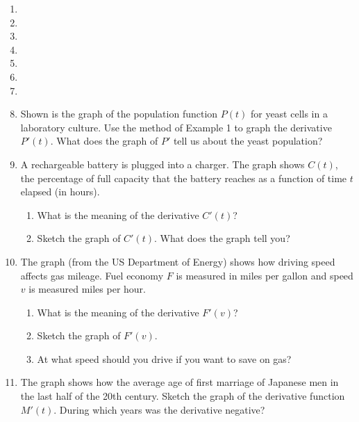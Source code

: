 \documentclass{article}
\begin{document}
\begin{enumerate}
		\item

		\item

		\item

		\item

		\item

		\item

		\item

		\item Shown is the graph of the population function $P(t)$ for yeast cells
			in a laboratory culture. Use the method of Example 1 to graph the
			derivative $P'(t)$. What does the graph of $P'$ tell us about the
			yeast population?

		\item A rechargeable battery is plugged into a charger. The graph shows $C(t)$,
			the percentage of full capacity that the battery reaches as a function
			of time $t$ elapsed (in hours).

		\begin{enumerate}
			\item What is the meaning of the derivative $C'(t)$?

			\item Sketch the graph of $C'(t)$. What does the graph tell you?
		\end{enumerate}

		\item The graph (from the US Department of Energy) shows how driving speed affects
			gas mileage. Fuel economy $F$ is measured in miles per gallon and speed $v$
			is measured miles per hour.

		\begin{enumerate}
			\item What is the meaning of the derivative $F'(v)$?

			\item Sketch the graph of $F'(v)$.

			\item At what speed should you drive if you want to save on gas?
		\end{enumerate}

		\item The graph shows how the average age of first marriage of Japanese men in
			the last half of the 20th century. Sketch the graph of the derivative function
			$M'(t)$. During which years was the derivative negative?


\end{enumerate}
\end{document}

